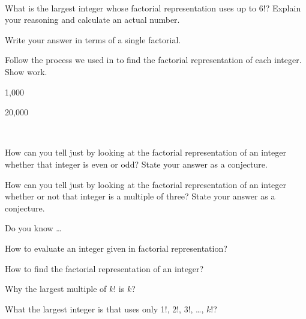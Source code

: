 \begin{exer}[\exerP] %
\label{exer_fact_rep_largest_upto6!}
~
    \begin{exerpart}
        \item What is the largest integer whose factorial representation uses up to 6!? Explain your reasoning and calculate an actual number. 
        \item Write your answer in terms of a single factorial.
    \end{exerpart}
\end{exer}

\begin{exer}[\exerU] %
\label{exer_larger_fact_rep}
    Follow the process we used in  to find the factorial representation of each integer. Show work. 
        \begin{exerpart}
            \item 1,000 
            \item 20,000
        \end{exerpart} 
\end{exer}

\begin{exer}[\exerU] %
\label{exer_fact_rep_divisibility}
~
    \begin{exerpart}
        \item \label{part_fact_rep_even_odd} How can you tell just by looking at the factorial representation of an integer whether that integer is even or odd? State your answer as a conjecture.
        \item \label{part_fact_rep_mult3} How can you tell just by looking at the factorial representation of an integer whether or not that integer is a multiple of three? State your answer as a conjecture.
    \end{exerpart}
\end{exer} 

\begin{exer}[\exerR] %
\label{exer_dyk_fact_rep}
    Do you know \ldots
        \begin{exerpart}
            \item How to evaluate an integer given in factorial representation?
            \item How to find the factorial representation of an integer?
            \item Why the largest multiple of $k!$ is $k$?
            \item What the largest integer is that uses only 1!, 2!, 3!, \ldots, $k!$?
        \end{exerpart}
\end{exer}

